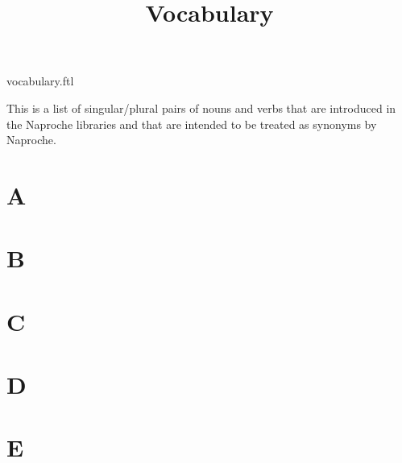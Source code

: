 \documentclass{article}
\title{Vocabulary}
\author{}
\date{}
\begin{document}
\begin{smodule}{vocabulary.ftl}

\maketitle

\noindent This is a list of singular/plural pairs of nouns and verbs that are
introduced in the Naproche libraries and that are intended to be treated as
synonyms by Naproche.


\section*{A}

\begin{forthel}
\end{forthel}


\section*{B}

\begin{forthel}
\end{forthel}


\section*{C}

\begin{forthel}
\end{forthel}


\section*{D}

\begin{forthel}
\end{forthel}


\section*{E}


\end{smodule}
\end{document}
